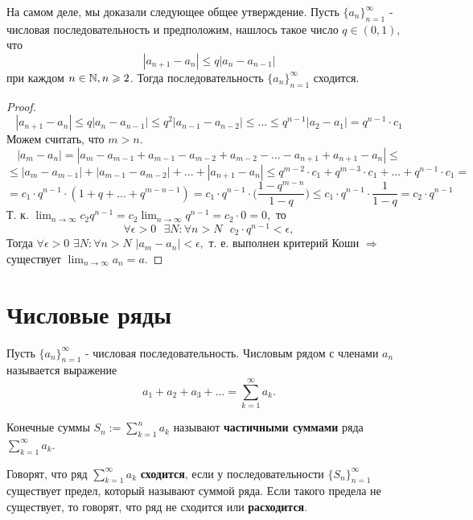 	\begin{mention}
		На самом деле, мы доказали следующее общее утверждение. Пусть $\{a_n\}^{\infty}_{n = 1}$ - числовая последовательность и предположим, нашлось такое число $q \in (0, 1)$, что 
		\[ |a_{n + 1} - a_n| \leqslant q |a_n - a_{n - 1}| \]
		при каждом $n \in \mathbb N, n \geqslant 2$. Тогда последовательность $\{a_n\}^{\infty}_{n = 1}$ сходится.
	\end{mention}
	
	\begin{proof}
		\[ |a_{n + 1} - a_n| \leqslant q |a_n - a_{n - 1}| \leqslant q^2 |a_{n - 1} - a_{n - 2}| \leqslant ... \leqslant q^{n - 1} |a_2 - a_1| = q^{n - 1} \cdot c_1 \]
		Можем считать, что $m > n$.
		\[ |a_m - a_n| = |a_m - a_{m - 1} + a_{m - 1} - a_{m - 2} + a_{m - 2} - ... - a_{n + 1} + a_{n + 1} - a_n| \leqslant \]
		\[ \leqslant |a_m - a_{m - 1}| + |a_{m - 1} - a_{m - 2}| + ... + |a_{n + 1} - a_n| \leqslant q^{m - 2} \cdot c_1 + q^{m - 3} \cdot c_1 + ... + q^{n - 1} \cdot c_1 = \]
		\[ = c_1 \cdot q^{n - 1} \cdot (1 + q + ... + q^{m - n - 1}) = c_1 \cdot q^{n - 1} \cdot \bigg(\frac{1 - q^{m - n}}{1 - q}\bigg) \leqslant c_1 \cdot q^{n - 1} \cdot \frac{1}{1 - q} = c_2 \cdot q^{n - 1} \]
		Т. к. $\lim_{n \to \infty} c_2 q^{n - 1} = c_2 \lim_{n \to \infty} q^{n - 1} = c_2 \cdot 0 = 0,$ то
		\[ \forall \epsilon > 0 \text{ } \exists N: \forall n > N \text{ } c_2 \cdot q^{n - 1} < \epsilon, \]
		Тогда $\forall \epsilon > 0$ $\exists N: \forall n > N$ $|a_m - a_n| < \epsilon,$ т. е. выполнен критерий Коши $\Rightarrow$ существует $\lim_{n \to \infty} a_n = a.$ 
	\end{proof}
	
	\section{Числовые ряды}
	
	\begin{definition}
		Пусть $\{a_n\}^{\infty}_{n = 1}$ - числовая последовательность. Числовым
		рядом с членами $a_n$ называется выражение 
		\[ a_1 + a_2 + a_3 + ... = \sum^{\infty}_{k = 1} a_k. \]
				
		Конечные суммы $S_n := \sum^n_{k = 1} a_k$ называют \textbf{частичными суммами} ряда $\sum^{\infty}_{k = 1} a_k$.
		
		Говорят, что ряд $\sum^{\infty}_{k = 1} a_k$ \textbf{сходится}, если у последовательности $\{S_n\}^{\infty}_{n = 1}$ существует предел, который называют суммой ряда. Если такого предела не существует, то говорят, что ряд не сходится или \textbf{расходится}.
	\end{definition}
		
